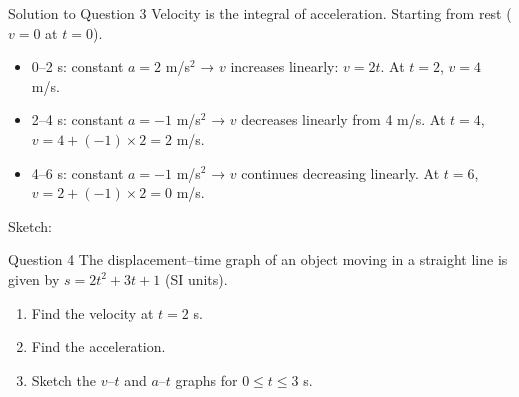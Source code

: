 \documentclass{beamer}
\begin{document}
\begin{frame}[shrink=15]{Solution to Question 3}
Velocity is the integral of acceleration. Starting from rest ($v=0$ at $t=0$).
\begin{itemize}
    \item 0–2 s: constant $a=2$ m/s$^2$ → $v$ increases linearly: $v = 2t$. At $t=2$, $v=4$ m/s.
    \item 2–4 s: constant $a=-1$ m/s$^2$ → $v$ decreases linearly from 4 m/s. At $t=4$, $v = 4 + (-1)\times2 = 2$ m/s.
    \item 4–6 s: constant $a=-1$ m/s$^2$ → $v$ continues decreasing linearly. At $t=6$, $v = 2 + (-1)\times2 = 0$ m/s.
\end{itemize}
Sketch:
\begin{center}
\end{center}
\end{frame}

\begin{frame}[shrink=15]{Question 4}
The displacement–time graph of an object moving in a straight line is given by $s = 2t^2 + 3t + 1$ (SI units).
\begin{enumerate}
    \item Find the velocity at $t=2$ s.
    \item Find the acceleration.
    \item Sketch the $v$–$t$ and $a$–$t$ graphs for $0 \le t \le 3$ s.
\end{enumerate}
\end{frame}
\end{document}
